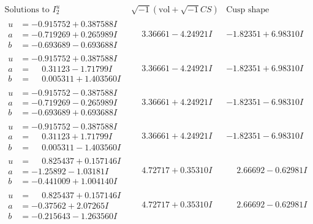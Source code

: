 \documentclass[1p]{elsarticle_modified}
\theoremstyle{definition}
\newcommand{\I}{\sqrt{-1}}
\begin{document}
$$\begin{array}{c|c|c}  
\text{Solutions to }I^u_{2}& \I (\text{vol} + \sqrt{-1}CS) & \text{Cusp shape}\\
 \hline 
\begin{aligned}
u &= -0.915752 + 0.387588 I \\
a &= -0.719269 + 0.265989 I \\
b &= -0.693689 - 0.693688 I\end{aligned}
 & \phantom{-}3.36661 - 4.24921 I & -1.82351 + 6.98310 I \\ \hline\begin{aligned}
u &= -0.915752 + 0.387588 I \\
a &= \phantom{-}0.31123 - 1.71799 I \\
b &= \phantom{-}0.005311 + 1.403560 I\end{aligned}
 & \phantom{-}3.36661 - 4.24921 I & -1.82351 + 6.98310 I \\ \hline\begin{aligned}
u &= -0.915752 - 0.387588 I \\
a &= -0.719269 - 0.265989 I \\
b &= -0.693689 + 0.693688 I\end{aligned}
 & \phantom{-}3.36661 + 4.24921 I & -1.82351 - 6.98310 I \\ \hline\begin{aligned}
u &= -0.915752 - 0.387588 I \\
a &= \phantom{-}0.31123 + 1.71799 I \\
b &= \phantom{-}0.005311 - 1.403560 I\end{aligned}
 & \phantom{-}3.36661 + 4.24921 I & -1.82351 - 6.98310 I \\ \hline\begin{aligned}
u &= \phantom{-}0.825437 + 0.157146 I \\
a &= -1.25892 - 1.03181 I \\
b &= -0.441009 + 1.004140 I\end{aligned}
 & \phantom{-}4.72717 + 0.35310 I & \phantom{-}2.66692 - 0.62981 I \\ \hline\begin{aligned}
u &= \phantom{-}0.825437 + 0.157146 I \\
a &= -0.37562 + 2.07265 I \\
b &= -0.215643 - 1.263560 I\end{aligned}
 & \phantom{-}4.72717 + 0.35310 I & \phantom{-}2.66692 - 0.62981 I \\ \hline\begin{aligned}

\end{aligned}
\end{array}$$
\end{document}
